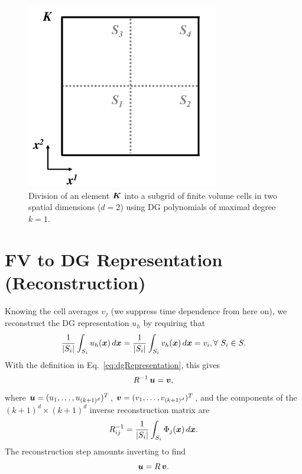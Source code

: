 \documentclass[10pt]{article}
\begin{document}
\begin{figure}
  \centering
  \includegraphics[width=0.75\textwidth]{./ElementSubgrid}
   \caption{Division of an element $\boldsymbol{K}$ into a subgrid of finite volume cells in two spatial dimensions ($d=2$) using DG polynomials of maximal degree $k=1$.}
  \label{fig:ElementSubgrid}
\end{figure}

\section{FV to DG Representation (Reconstruction)}

Knowing the cell averages $v_{j}$ (we suppress time dependence from here on), we reconstruct the DG representation $u_{h}$ by requiring that
\begin{equation}
  \frac{1}{|S_{i}|}\int_{S_{i}}u_{h}(\boldsymbol{x})\,d\boldsymbol{x}
  =\frac{1}{|S_{i}|}\int_{S_{i}}v_{h}(\boldsymbol{x})\,d\boldsymbol{x}=v_{i}, \forall~S_{i}\in S.
\end{equation}
With the definition in Eq.~\eqref{eq:dgRepresentation}, this gives
\begin{equation}
  R^{-1}\,\boldsymbol{u} = \boldsymbol{v},
\end{equation}
where $\boldsymbol{u}=(u_{1},\ldots,u_{(k+1)^{d}})^{T}$, $\boldsymbol{v}=(v_{1},\ldots,v_{(k+1)^{d}})^{T}$, and the components of the $(k+1)^{d}\times(k+1)^{d}$ inverse reconstruction matrix are
\begin{equation}
  R_{ij}^{-1}=\frac{1}{|S_{i}|}\int_{S_{i}}\Phi_{j}(\boldsymbol{x})\,d\boldsymbol{x}.  
\end{equation}
The reconstruction step amounts inverting to find
\begin{equation}
  \boldsymbol{u} = R\,\boldsymbol{v}.
\end{equation}
\end{document}
